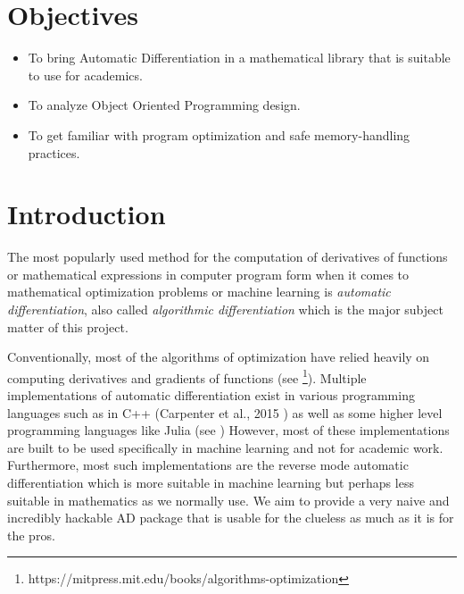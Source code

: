 \documentclass[12pt]{article}
\begin{document}
\newpage

\newpage
\pagestyle{fancy}
\fancyhead[L]{}
\renewcommand{\headrulewidth}{0pt}
\renewcommand{\footrulewidth}{0pt}
\section{Objectives}
\begin{itemize}
	\item To bring Automatic Differentiation in a mathematical library
			that is suitable to use for academics.
	\item To analyze Object Oriented Programming design. 
	\item To get familiar with program optimization and safe memory-handling
	practices.
\end{itemize}
\section{Introduction}
The most popularly used method for the computation of derivatives of 
functions or mathematical expressions in computer program form when
it comes to mathematical optimization problems or machine learning 
is \emph{automatic differentiation}, also called 
\emph{algorithmic differentiation} which is the major subject 
matter of this project. 

Conventionally, most of the algorithms of optimization have 
relied heavily on computing derivatives and gradients of functions
(see \cite{kochenderfer}\footnote{\label{kochenderfer}https://mitpress.mit.edu/books/algorithms-optimization}).
Multiple implementations of automatic differentiation exist in 
various programming languages such as in C++ (Carpenter et al., 2015 \cite{carpenter2015stan})
as well as some higher level programming languages like Julia (see \cite{RevelsLubinPapamarkou2016})
However, most of these implementations are built to be used specifically
in machine learning and not for academic work. Furthermore, most 
such implementations are the reverse mode automatic 
differentiation which is more suitable in machine learning but 
perhaps less suitable in mathematics as we normally use. We aim to 
provide a very naive and incredibly hackable AD package that is 
usable for the clueless as much as it is for the pros. 
\end{document}
